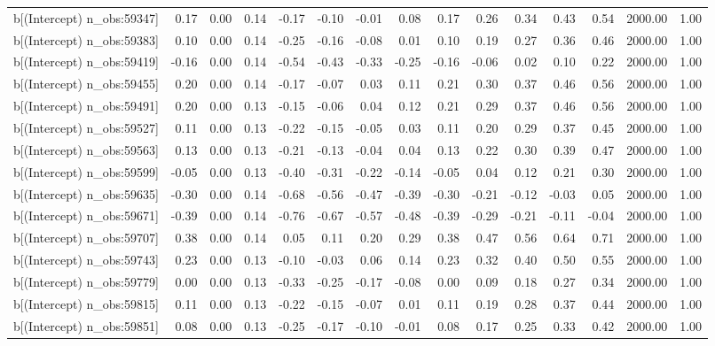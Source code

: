 \begin{table}[ht]
\begin{tabular}{rrrrrrrrrrrrrrr}
  b[(Intercept) n\_obs:59347] & 0.17 & 0.00 & 0.14 & -0.17 & -0.10 & -0.01 & 0.08 & 0.17 & 0.26 & 0.34 & 0.43 & 0.54 & 2000.00 & 1.00 \\ 
  b[(Intercept) n\_obs:59383] & 0.10 & 0.00 & 0.14 & -0.25 & -0.16 & -0.08 & 0.01 & 0.10 & 0.19 & 0.27 & 0.36 & 0.46 & 2000.00 & 1.00 \\ 
  b[(Intercept) n\_obs:59419] & -0.16 & 0.00 & 0.14 & -0.54 & -0.43 & -0.33 & -0.25 & -0.16 & -0.06 & 0.02 & 0.10 & 0.22 & 2000.00 & 1.00 \\ 
  b[(Intercept) n\_obs:59455] & 0.20 & 0.00 & 0.14 & -0.17 & -0.07 & 0.03 & 0.11 & 0.21 & 0.30 & 0.37 & 0.46 & 0.56 & 2000.00 & 1.00 \\ 
  b[(Intercept) n\_obs:59491] & 0.20 & 0.00 & 0.13 & -0.15 & -0.06 & 0.04 & 0.12 & 0.21 & 0.29 & 0.37 & 0.46 & 0.56 & 2000.00 & 1.00 \\ 
  b[(Intercept) n\_obs:59527] & 0.11 & 0.00 & 0.13 & -0.22 & -0.15 & -0.05 & 0.03 & 0.11 & 0.20 & 0.29 & 0.37 & 0.45 & 2000.00 & 1.00 \\ 
  b[(Intercept) n\_obs:59563] & 0.13 & 0.00 & 0.13 & -0.21 & -0.13 & -0.04 & 0.04 & 0.13 & 0.22 & 0.30 & 0.39 & 0.47 & 2000.00 & 1.00 \\ 
  b[(Intercept) n\_obs:59599] & -0.05 & 0.00 & 0.13 & -0.40 & -0.31 & -0.22 & -0.14 & -0.05 & 0.04 & 0.12 & 0.21 & 0.30 & 2000.00 & 1.00 \\ 
  b[(Intercept) n\_obs:59635] & -0.30 & 0.00 & 0.14 & -0.68 & -0.56 & -0.47 & -0.39 & -0.30 & -0.21 & -0.12 & -0.03 & 0.05 & 2000.00 & 1.00 \\ 
  b[(Intercept) n\_obs:59671] & -0.39 & 0.00 & 0.14 & -0.76 & -0.67 & -0.57 & -0.48 & -0.39 & -0.29 & -0.21 & -0.11 & -0.04 & 2000.00 & 1.00 \\ 
  b[(Intercept) n\_obs:59707] & 0.38 & 0.00 & 0.14 & 0.05 & 0.11 & 0.20 & 0.29 & 0.38 & 0.47 & 0.56 & 0.64 & 0.71 & 2000.00 & 1.00 \\ 
  b[(Intercept) n\_obs:59743] & 0.23 & 0.00 & 0.13 & -0.10 & -0.03 & 0.06 & 0.14 & 0.23 & 0.32 & 0.40 & 0.50 & 0.55 & 2000.00 & 1.00 \\ 
  b[(Intercept) n\_obs:59779] & 0.00 & 0.00 & 0.13 & -0.33 & -0.25 & -0.17 & -0.08 & 0.00 & 0.09 & 0.18 & 0.27 & 0.34 & 2000.00 & 1.00 \\ 
  b[(Intercept) n\_obs:59815] & 0.11 & 0.00 & 0.13 & -0.22 & -0.15 & -0.07 & 0.01 & 0.11 & 0.19 & 0.28 & 0.37 & 0.44 & 2000.00 & 1.00 \\ 
  b[(Intercept) n\_obs:59851] & 0.08 & 0.00 & 0.13 & -0.25 & -0.17 & -0.10 & -0.01 & 0.08 & 0.17 & 0.25 & 0.33 & 0.42 & 2000.00 & 1.00 \\ 

\end{tabular}
\end{table}
